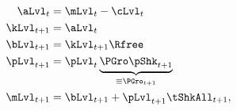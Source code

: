   \begin{equation}\label{eq:DBCparts}
   \begin{split}
     \aLvl_{t}     & = \mLvl_{t}-\cLvl_{t}
\\     \kLvl_{t+1}   & = \aLvl_{t} \notag
\\      \bLvl_{t+1}    & = \kLvl_{t+1} \Rfree \notag \\
      \pLvl_{t+1}  & = \pLvl_{t} \underbrace{\PGro\pShk_{t+1}}_{\equiv \PGro_{t+1}} \notag \\
      \mLvl_{t+1}  & =  \bLvl_{t+1} +\pLvl_{t+1}\tShkAll_{t+1},\notag
   \end{split}
  \end{equation}
